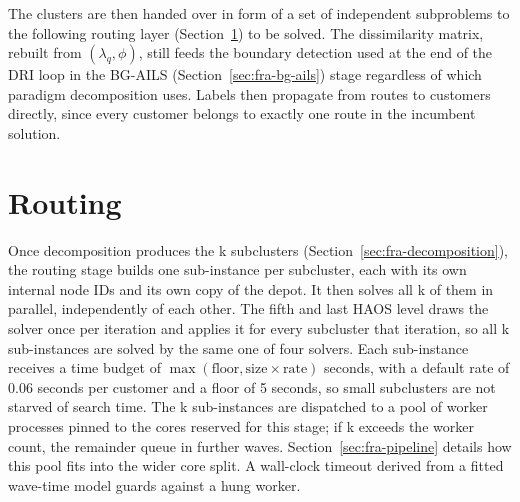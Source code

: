 The clusters are then handed over in form of a set of independent subproblems to the following routing layer (Section~\ref{sec:fra-routing}) to be solved. The dissimilarity matrix, rebuilt from $(\lambda_q, \phi)$, still feeds the boundary detection used at the end of the DRI loop in the BG-AILS (Section~\ref{sec:fra-bg-ails}) stage regardless of which paradigm decomposition uses. Labels then propagate from routes to customers directly, since every customer belongs to exactly one route in the incumbent solution. 


\section{Routing}\label{sec:fra-routing}

Once decomposition produces the k subclusters (Section~\ref{sec:fra-decomposition}), the routing stage builds one sub-instance per subcluster, each with its own internal node IDs and its own copy of the depot. It then solves all k of them in parallel, independently of each other. The fifth and last HAOS level draws the solver once per iteration and applies it for every subcluster that iteration, so all k sub-instances are solved by the same one of four solvers. Each sub-instance receives a time budget of $\max(\text{floor}, \text{size} \times \text{rate})$ seconds, with a default rate of 0.06 seconds per customer and a floor of 5 seconds, so small subclusters are not starved of search time. The k sub-instances are dispatched to a pool of worker processes pinned to the cores reserved for this stage; if k exceeds the worker count, the remainder queue in further waves. Section~\ref{sec:fra-pipeline} details how this pool fits into the wider core split. A wall-clock timeout derived from a fitted wave-time model guards against a hung worker.

